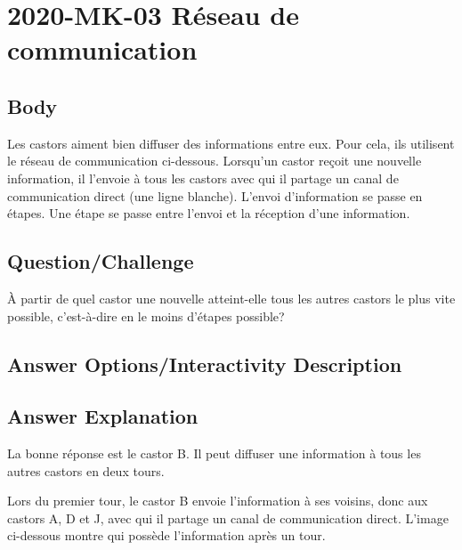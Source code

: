 \documentclass[a4paper,11pt]{report}
\newcommand{\taskGraphicsFolder}{..}
\begin{document}
\section*{\centering{} 2020-MK-03 Réseau de communication}


\subsection*{Body}

Les castors aiment bien diffuser des informations entre eux. Pour cela, ils utilisent le réseau de communication ci-dessous. Lorsqu’un castor reçoit une nouvelle information, il l’envoie à tous les castors avec qui il partage un canal de communication direct (une ligne blanche). L’envoi d’information se passe en étapes. Une étape se passe entre l’envoi et la réception d’une information.

{\em

\subsection*{Question/Challenge}

À partir de quel castor une nouvelle atteint-elle tous les autres castors le plus vite possible, c’est-à-dire en le moins d’étapes possible?

{\centering%
\par}

}\begingroup
\renewcommand{\arraystretch}{1.5}
\subsection*{Answer Options/Interactivity Description}



\endgroup

\subsection*{Answer Explanation}

La bonne réponse est le castor B. Il peut diffuser une information à tous les autres castors en deux tours.

Lors du premier tour, le castor B envoie l’information à ses voisins, donc aux castors A, D et J, avec qui il partage un canal de communication direct. L’image ci-dessous montre qui possède l’information après un tour.
\end{document}
